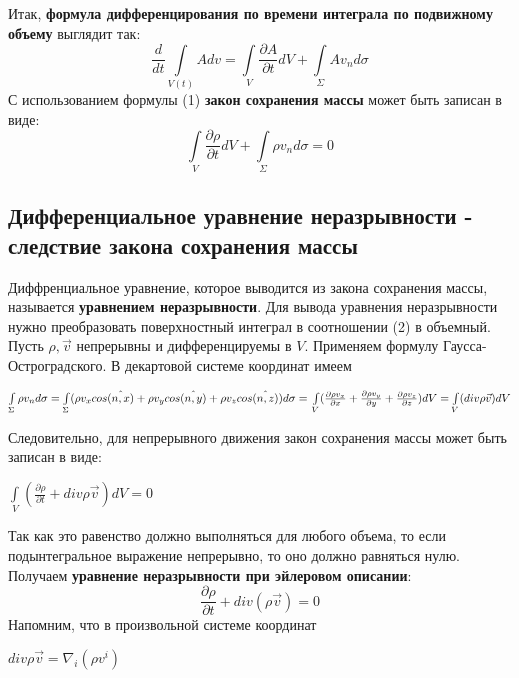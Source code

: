 Итак, \textbf{формула дифференцирования по времени интеграла по подвижному объему} выглядит так:
\begin{equation}
    \frac{d}{dt}\int\limits_{V(t)}A dv= \int\limits_V \frac{\partial A}{\partial t} dV + \int\limits_{\Sigma}A v_n d\sigma
\end{equation}
С использованием формулы (1) \textbf{закон сохранения массы} может быть записан в виде:
\begin{equation}
    \int\limits_V \frac{\partial \rho}{\partial t} dV + \int\limits_{\Sigma}\rho v_n d \sigma = 0
\end{equation}

\subsection{Дифференциальное уравнение неразрывности - следствие закона сохранения массы}
Диффренциальное уравнение, которое выводится из закона сохранения массы, называется \textbf{уравнением неразрывности}. Для вывода уравнения неразрывности нужно преобразовать поверхностный интеграл в соотношении (2) в объемный. Пусть $\rho, \Vec{v}$ непрерывны и дифференцируемы в $V$. Применяем формулу Гаусса-Остроградского. В декартовой системе координат имеем
\begin{center}$
\int\limits_{\Sigma} \rho v_n d \sigma
= \int\limits_{\Sigma} (\rho v_x cos \hat{(n,x)} + \rho v_y cos \hat{(n,y)} + \rho v_z cos \hat{(n,z)})d \sigma
=\newline
\int\limits_V ( \frac{\partial \rho v_x}{\partial x} + \frac{\partial \rho v_y}{\partial y} + \frac{\partial \rho v_z}{\partial z})dV
=
\int\limits_V (div \rho \Vec{v})dV
$\end{center}
Следовительно, для непрерывного движения закон сохранения массы может быть записан в виде:
\begin{center}$
\int\limits_V (\frac{\partial \rho}{\partial t} + div \rho \Vec{v})dV = 0
$\end{center}
Так как это равенство должно выполняться для любого объема, то если подынтегральное выражение непрерывно, то оно должно равняться нулю. Получаем
\textbf{уравнение неразрывности при эйлеровом описании}:
\begin{equation}
    \frac{\partial \rho}{\partial t} + div (\rho \Vec{v}) = 0
\end{equation}
Напомним, что в произвольной системе координат
\begin{center}$
div \rho \Vec{v} = \nabla_i(\rho v^i)
$\end{center}
